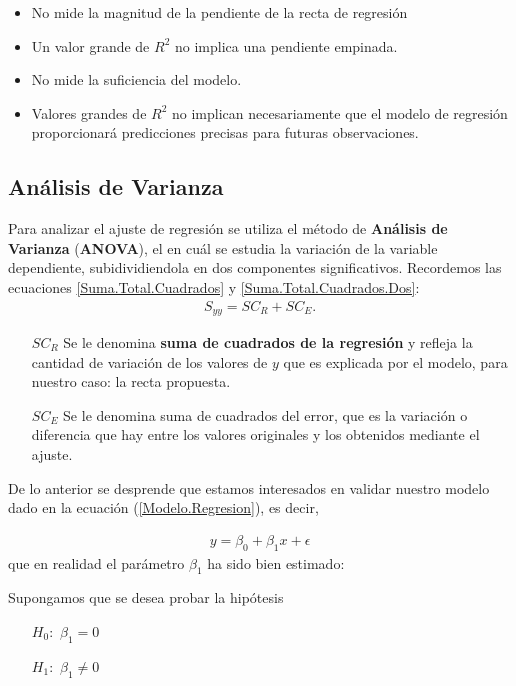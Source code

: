 \begin{itemize}
\begin{enumerate}
\begin{itemize}
\item No mide la magnitud de la pendiente de la recta de regresi\'on
\item Un valor grande de $R^{2}$ no implica una pendiente empinada.
\item No mide la suficiencia del modelo.
\item Valores grandes de $R^{2}$ no implican necesariamente que el modelo de regresi\'on proporcionar\'a predicciones precisas para futuras observaciones.
\end{itemize}
\subsection*{An\'alisis de Varianza}
Para analizar el ajuste de regresi\'on se utiliza el m\'etodo de  \textbf{An\'alisis de Varianza} (\textbf{ANOVA}), el en cu\'al  se estudia la variaci\'on de la variable dependiente, subidividiendola en dos componentes significativos.
Recordemos las ecuaciones \ref{Suma.Total.Cuadrados} y \ref{Suma.Total.Cuadrados.Dos}:
\begin{eqnarray*}
S_{yy}=SC_{R}+SC_{E}.
\end{eqnarray*}

\begin{itemize}
\item[$SC_{R}$] Se le denomina \textbf{suma de cuadrados de la regresi\'on} y refleja la cantidad de variaci\'on de los valores de $y$ que es explicada por el modelo, para nuestro caso: la recta propuesta.

\item[$SC_{E}$] Se le denomina suma de cuadrados del error, que es la variaci\'on o diferencia que hay entre los valores originales y los obtenidos mediante el ajuste. 
\end{itemize}

De lo anterior se desprende que estamos interesados en validar nuestro modelo dado en la ecuaci\'on (\ref{Modelo.Regresion}), es decir, 

\begin{eqnarray*}
y=\beta_{0}+\beta_{1}x+\epsilon
\end{eqnarray*}
que en realidad el par\'ametro $\beta_{1}$ ha sido bien estimado:

Supongamos que se desea probar la hip\'otesis
\begin{itemize}
\item[$H_{0}:$] $\beta_{1}=0$
\item[$H_{1}:$] $\beta_{1}\neq0$
\end{itemize}


\end{enumerate}
\end{itemize}
